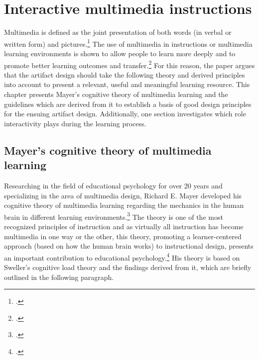\chapter{Interactive multimedia instructions} \label{chapter:Multimedia}

Multimedia is defined as the joint presentation of both words (in verbal or written form) and pictures.\footcites[Cf.][p.2]{MayerMultimediaLearning2009}[cf.][p.1205]{MarraffinoApplyingMultimediaLearning2016}[cf.][p.13]{MayerAnimationAidMultimedia2001} The use of multimedia in instructions or multimedia learning environments is shown to allow people to learn more deeply and to promote better learning outcomes and transfer.\footcites[Cf.][p.3]{MayerMultimediaLearning2009}[cf. in addition][]{MunzerLearningmultimediapresentations2009} For this reason, the paper argues that the artifact design should take the following theory and derived principles into account to present a relevant, useful and meaningful learning resource. This chapter presents Mayer's cognitive theory of multimedia learning and the guidelines which are derived from it to establish a basis of good design principles for the ensuing artifact design. Additionally, one section investigates which role interactivity plays during the learning process. 

\section{Mayer's cognitive theory of multimedia learning} \label{sec:MayersCTML}
Researching in the field of educational psychology for over 20 years and specializing in the area of multimedia design, Richard E. Mayer developed his cognitive theory of multimedia learning regarding the mechanics in the human brain in different learning environments.\footcites[Cf.][]{MayerMultimediaLearning2009}
The theory is one of the most recognized principles of instruction and as virtually all instruction has become multimedia in one way or the other, this theory, promoting a learner-centered approach (based on how the human brain works) to instructional design, presents an important contribution to educational psychology.\footcites[Cf.][chapter 1, paragraph 3]{ClarkElearningscienceinstruction2016}[cf.][p.4 et seqq]{MayerMultimediaLearning2009}[cf. in addition][]{SordenCognitiveTheoryMultimedia2012}
His theory is based on Sweller's cognitive load theory and the findings derived from it, which are briefly outlined in the following paragraph.

